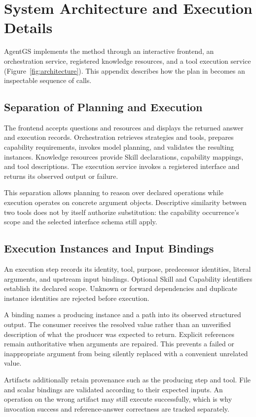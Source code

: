 \section{System Architecture and Execution Details}
\label{sec:system}
AgentGS implements the method through an interactive frontend, an orchestration service, registered knowledge resources, and a tool execution service (Figure~\ref{fig:architecture}). This appendix describes how the plan in  becomes an inspectable sequence of calls.


\subsection{Separation of Planning and Execution}
The frontend accepts questions and resources and displays the returned answer and execution records. Orchestration retrieves strategies and tools, prepares capability requirements, invokes model planning, and validates the resulting instances. Knowledge resources provide Skill declarations, capability mappings, and tool descriptions. The execution service invokes a registered interface and returns its observed output or failure.

This separation allows planning to reason over declared operations while execution operates on concrete argument objects. Descriptive similarity between two tools does not by itself authorize substitution: the capability occurrence's scope and the selected interface schema still apply.

\subsection{Execution Instances and Input Bindings}
An execution step records its identity, tool, purpose, predecessor identities, literal arguments, and upstream input bindings. Optional Skill and Capability identifiers establish its declared scope. Unknown or forward dependencies and duplicate instance identities are rejected before execution.

A binding names a producing instance and a path into its observed structured output. The consumer receives the resolved value rather than an unverified description of what the producer was expected to return. Explicit references remain authoritative when arguments are repaired. This prevents a failed or inappropriate argument from being silently replaced with a convenient unrelated value.

Artifacts additionally retain provenance such as the producing step and tool. File and scalar bindings are validated according to their expected inputs. An operation on the wrong artifact may still execute successfully, which is why invocation success and reference-answer correctness are tracked separately.

